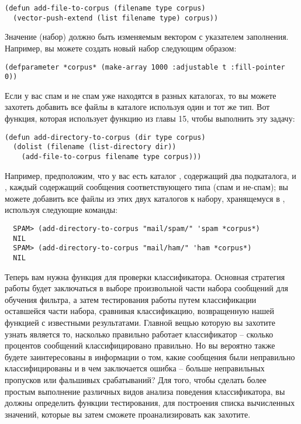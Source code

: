 \begin{lstlisting}
(defun add-file-to-corpus (filename type corpus)
  (vector-push-extend (list filename type) corpus))
\end{lstlisting}

Значение  (набор) должно быть изменяемым вектором с указателем заполнения.
Например, вы можете создать новый набор следующим образом:

\begin{lstlisting}
(defparameter *corpus* (make-array 1000 :adjustable t :fill-pointer 0))
\end{lstlisting}

Если у вас спам и не спам уже находятся в разных каталогах, то вы можете захотеть добавить
все файлы в каталоге используя один и тот же тип.  Вот функция, которая использует функцию
 из главы 15, чтобы выполнить эту задачу:

\begin{lstlisting}
(defun add-directory-to-corpus (dir type corpus)
  (dolist (filename (list-directory dir))
    (add-file-to-corpus filename type corpus)))
\end{lstlisting}

Например, предположим, что у вас есть каталог , содержащий два подкаталога,
 и , каждый содержащий сообщения соответствующего типа (спам и
не-спам); вы можете добавить все файлы из этих двух каталогов к набору, хранящемуся в
, используя следующие команды:

\begin{verbatim}
  SPAM> (add-directory-to-corpus "mail/spam/" 'spam *corpus*)
  NIL
  SPAM> (add-directory-to-corpus "mail/ham/" 'ham *corpus*)
  NIL
\end{verbatim}

Теперь вам нужна функция для проверки классификатора.  Основная стратегия работы будет
заключаться в выборе произвольной части набора сообщений для обучения фильтра, а затем
тестирования работы путем классификации оставшейся части набора, сравнивая классификацию,
возвращенную нашей функцией с известными результатами.  Главной вещью которую вы захотите
узнать является то, насколько правильно работает классификатор -- сколько процентов
сообщений классифицировано правильно.  Но вы вероятно также будете заинтересованы в
информации о том, какие сообщения были неправильно классифицированы и в чем заключается
ошибка -- больше неправильных пропусков или фальшивых срабатываний?  Для того, чтобы
сделать более простым выполнение различных видов анализа поведения классификатора, вы
должны определить функции тестирования, для построения списка вычисленных значений,
которые вы затем сможете проанализировать как захотите.

